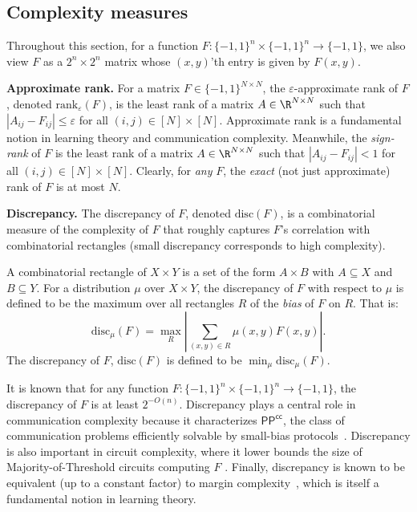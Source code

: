 \documentclass{toc}
\newcommand{\bits}{\{-1,1\}}
\newcommand{\eps}{\varepsilon}
\begin{document}
\subsection{Complexity measures}
Throughout this section, for a function $F \colon \bits^n \times \bits^n \to \bits$,
we also view $F$ as a $2^n \times 2^n$ matrix whose $(x, y)$'th entry is given by $F(x, y)$.

\medskip \noindent \textbf{Approximate rank.} For a matrix $F \in \bits^{N \times N}$, 
the $\eps$-approximate rank of $F$, denoted $\text{rank}_{\eps}(F)$, is the least rank
of a matrix $A \in \R^{N \times N}$ such that $|A_{ij} - F_{ij}| \leq \eps$ for all $(i, j) \in [N] \times [N]$.
Approximate rank is a fundamental notion in learning theory and communication complexity.
Meanwhile, the \emph{sign-rank} of $F$ is the least rank of a matrix  $A \in \R^{N \times N}$ such that $|A_{ij} - F_{ij}| < 1$ for all $(i, j) \in [N] \times [N]$.
Clearly, for \emph{any} $F$, the \emph{exact} (not just approximate) rank of $F$ is at most $N$. 

%

\medskip \noindent \textbf{Discrepancy.} The discrepancy of $F$, denoted
$\mathrm{disc}(F)$, is a combinatorial measure of the complexity of $F$ that roughly
captures $F$'s correlation with combinatorial rectangles (small discrepancy
corresponds to high complexity).

\begin{definition} \label{def:disc}
	A combinatorial rectangle of $X \times Y$ is a set of the form $A \times B$ with $A \subseteq X$ and $B \subseteq Y$. 
	For a distribution $\mu$ over $X \times Y$, the discrepancy of $F$ with respect to $\mu$ is defined to be the maximum over all rectangles $R$ of the \emph{bias} of $F$ on $R$. That is:
	$$\mathrm{disc}_\mu(F) = \max_{R} \left|\sum_{(x, y) \in R} \mu(x, y) F(x, y)\right|.$$ The discrepancy of $F$, $\mathrm{disc}(F)$ is defined to be $\min_\mu \mathrm{disc}_\mu(F)$.
\end{definition}

It is known that for any function $F \colon \bits^n \times \bits^n \to \bits$, the discrepancy of $F$ is at least $2^{-O(n)}$. 
Discrepancy plays a central role in communication complexity because it characterizes
$\mathsf{PP}^{\mathsf{cc}}$, the
class of communication problems efficiently solvable by small-bias protocols~\cite{klauck2001lower}. Discrepancy is also important in circuit complexity, where it lower bounds
the size of Majority-of-Threshold circuits computing $F$ \cite{ghr, hajnal, nisan, sherstovmajmaj}. 
Finally, discrepancy
is known to be equivalent (up to a constant factor) to margin complexity~\cite{linial2009learning}, 
which is itself a fundamental notion in learning
theory. 
\end{document}
